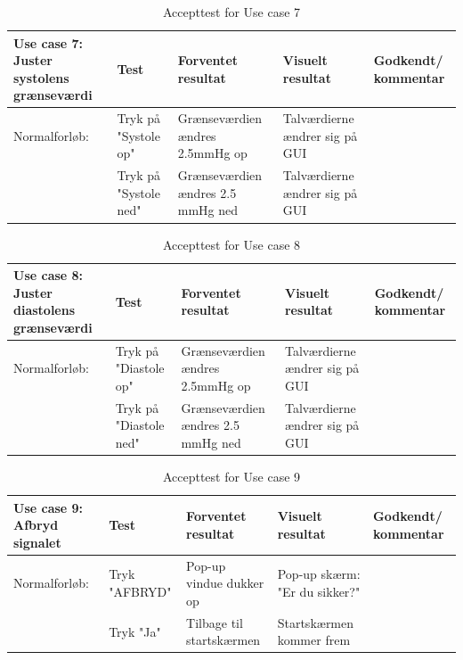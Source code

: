 \begin{table}[H]
\caption{Accepttest for Use case 7}\label{tab:tabel8}
\begin{tabular}{|>{\raggedright\arraybackslash}p{2.5cm}| >{\raggedright\arraybackslash}p{2.9cm} | >{\raggedright\arraybackslash}p{2.9cm} | >{\raggedright\arraybackslash}p{2.9cm} | >{\raggedright\arraybackslash}p{2.8cm} |}
   \hline
   \textbf{Use case 7: Juster systolens grænseværdi } &\textbf{Test}& \textbf{Forventet resultat} & \textbf{Visuelt resultat} & \textbf{Godkendt/ kommentar}\\ \hline
   Normalforløb:& Tryk på "Systole op"& Grænseværdien ændres 2.5mmHg op & Talværdierne ændrer sig på GUI &\\\hline
   &Tryk på "Systole ned" & Grænseværdien ændres 2.5 mmHg ned & Talværdierne ændrer sig på GUI & \\\hline
\end{tabular}
\end{table}


\begin{table}[H]
\caption{Accepttest for Use case 8}\label{tab:tabel8}
\begin{tabular}{|>{\raggedright\arraybackslash}p{2.5cm}| >{\raggedright\arraybackslash}p{2.9cm} | >{\raggedright\arraybackslash}p{2.9cm} | >{\raggedright\arraybackslash}p{2.9cm} | >{\raggedright\arraybackslash}p{2.8cm} |}
   \hline
   \textbf{Use case 8: Juster diastolens grænseværdi } &\textbf{Test}& \textbf{Forventet resultat} & \textbf{Visuelt resultat} & \textbf{Godkendt/ kommentar}\\ \hline
   Normalforløb:&Tryk på "Diastole op"  & Grænseværdien ændres 2.5mmHg op & Talværdierne ændrer sig på GUI &\\\hline
   &Tryk på "Diastole ned" & Grænseværdien ændres 2.5 mmHg ned & Talværdierne ændrer sig på GUI &\\\hline
\end{tabular}
\end{table}

\begin{table}[H]
\caption{Accepttest for Use case 9}\label{tab:tabel8}
\begin{tabular}{|>{\raggedright\arraybackslash}p{2.5cm}| >{\raggedright\arraybackslash}p{2.9cm} | >{\raggedright\arraybackslash}p{2.9cm} | >{\raggedright\arraybackslash}p{2.9cm} | >{\raggedright\arraybackslash}p{2.8cm} |}
   \hline
   \textbf{Use case 9: Afbryd signalet } &\textbf{Test}& \textbf{Forventet resultat} & \textbf{Visuelt resultat} & \textbf{Godkendt/ kommentar}\\ \hline
   Normalforløb:& Tryk "AFBRYD" & Pop-up vindue dukker op & Pop-up skærm: "Er du sikker?" &\\\hline
   &Tryk "Ja"&Tilbage til startskærmen& Startskærmen kommer frem&\\\hline
\end{tabular}
\end{table}

